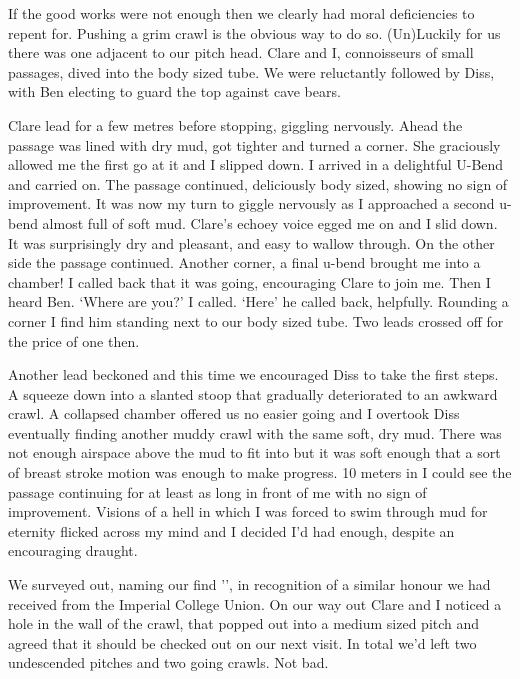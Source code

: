 If the good works were not enough then we clearly had moral deficiencies to repent for. Pushing a grim crawl is the obvious way to do so. (Un)Luckily for us there was one adjacent to our pitch head. Clare and I, connoisseurs of small passages, dived into the body sized tube. We were reluctantly followed by Diss, with Ben electing to guard the top against cave bears.

Clare lead for a few metres before stopping, giggling nervously. Ahead the passage was lined with dry mud, got tighter and turned a corner. She graciously allowed me the first go at it and I slipped down. I arrived in a delightful U-Bend and carried on. The passage continued, deliciously body sized, showing no sign of improvement. It was now my turn to giggle nervously as I approached a second u-bend almost full of soft mud. Clare’s echoey voice egged me on and I slid down. It was surprisingly dry and pleasant, and easy to wallow through. On the other side the passage continued. Another corner, a final  u-bend brought me into a chamber! I called back that it was going, encouraging Clare to join me. Then I heard Ben. 
‘Where are you?’ I called. 
‘Here’ he called back, helpfully. 
Rounding a corner I find him standing next to our body sized tube. Two leads crossed off for the price of one then.
 
Another lead beckoned and this time we encouraged Diss to take the first steps. A squeeze down into a slanted stoop that gradually deteriorated to an awkward crawl. A collapsed chamber offered us no easier going and I overtook Diss eventually finding another muddy crawl with the same soft, dry mud. There was not enough airspace above the mud to fit into but it was soft enough that a sort of breast stroke motion was enough to make progress. 10 meters in I could see the passage continuing for at least as long in front of me with no sign of improvement. Visions of a hell in which I was forced to swim through mud for eternity flicked across my mind and I decided I’d had enough, despite an encouraging draught.
 
We surveyed out, naming our find '', in recognition of a similar honour we had received from the Imperial College Union. On our way out Clare and I noticed a hole in the wall of the crawl, that popped out into a medium sized pitch and agreed that it should be checked out on our next visit. In total we’d left two undescended pitches and two going crawls. Not bad.
 

